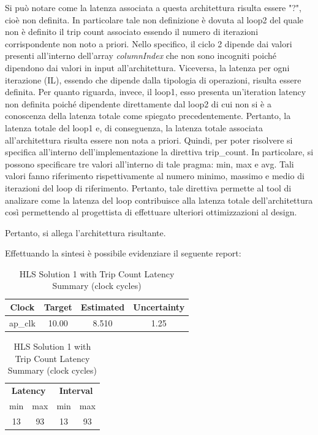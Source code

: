 Si può notare come la latenza associata a questa architettura risulta essere "?", cioè non definita. In particolare tale non definizione è dovuta al loop2 del quale non è definito il trip count associato essendo il numero di iterazioni corrispondente non noto a priori. Nello specifico, il ciclo 2 dipende dai valori presenti all'interno dell'array \textit{columnIndex} che non sono incogniti poiché dipendono dai valori in input all'architettura. Viceversa, la latenza per ogni iterazione (IL), essendo che dipende dalla tipologia di operazioni, risulta essere definita. Per quanto riguarda, invece, il loop1, esso presenta un'iteration latency non definita poiché dipendente direttamente dal loop2 di cui non si è a conoscenza della latenza totale come spiegato precedentemente. Pertanto, la latenza totale del loop1 e, di conseguenza, la latenza totale associata all'architettura risulta essere non nota a priori. Quindi, per poter risolvere si specifica all'interno dell'implementazione la direttiva trip\_count. In particolare, si possono specificare tre valori all'interno di tale pragma: min, max e avg. Tali valori fanno riferimento rispettivamente al numero minimo, massimo e medio di iterazioni del loop di riferimento. Pertanto, tale direttiva permette al tool di analizare come la latenza del loop contribuisce alla latenza totale dell'architettura così permettendo al progettista di effettuare ulteriori ottimizzazioni al design.

Pertanto, si allega l'architettura risultante.


Effettuando la sintesi è possibile evidenziare il seguente report:\\
\begin{table}[H]
	\centering
	\begin{minipage}[t]{0.45\linewidth}
		\centering
		\begin{tabular}{|c|c|c|c|}
			\hline
			\textbf{Clock} & \textbf{Target} & \textbf{Estimated} & \textbf{Uncertainty} \\
			\hline
			ap\_clk & 10.00 & 8.510 & 1.25 \\
			\hline
		\end{tabular}
		\caption{HLS Solution 1 with Trip Count Timing Summary (ns)}
		\label{tab:hls-solution-1-timing-summary}
	\end{minipage}
	\hfill
	\begin{minipage}[t]{0.45\linewidth}
		\centering
		\begin{tabular}{|c|c|c|c|}
			\hline
			\multicolumn{2}{|c|}{\textbf{Latency}} & \multicolumn{2}{|c|}{\textbf{Interval}} \\
			min & max & min & max \\
			\hline
			13 & 93 & 13 & 93 \\
			\hline
		\end{tabular}
		\caption{HLS Solution 1 with Trip Count Latency Summary (clock cycles)}
		\label{tab:hls-solution-1-latency-summary}
	\end{minipage}
\end{table}

